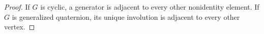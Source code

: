 \documentclass{article}
\theoremstyle{definition}
\theoremstyle{indentclaim}
\newtheorem*{claim}{Claim}
\theoremstyle{named}
\theoremstyle{named}
\begin{document}
\begin{proof}

If $G$ is cyclic, a generator is adjacent to every other nonidentity element.
If $G$ is generalized quaternion, its unique involution is adjacent to every other vertex.


\end{proof}
\end{document}

